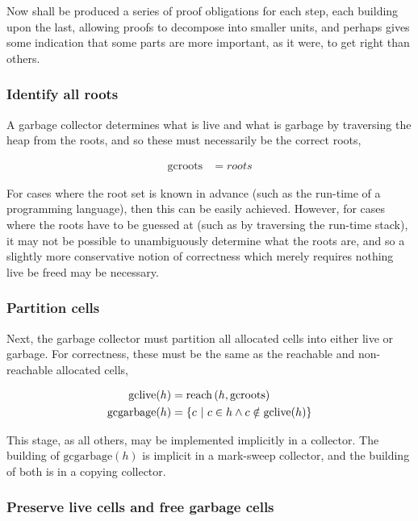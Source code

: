 Now shall be produced a series of proof obligations for each step,
each building upon the last, allowing proofs to decompose into smaller
units, and perhaps gives some indication that some parts are more
important, as it were, to get right than others.

\subsubsection{Identify all roots}
\label{sec:gc-framework-obligations-roots}

A garbage collector determines what is live and what is garbage by
traversing the heap from the roots, and so these must necessarily be
the correct roots,

\begin{align*}
  \mathrm{gcroots} &= roots
\end{align*}

For cases where the root set is known in advance (such as the run-time
of a programming language), then this can be easily achieved. However,
for cases where the roots have to be guessed at (such as by traversing
the run-time stack), it may not be possible to unambiguously determine
what the roots are, and so a slightly more conservative notion of
correctness which merely requires nothing live be freed may be
necessary.

\subsubsection{Partition cells}
\label{sec:gc-framework-obligations-partition}

Next, the garbage collector must partition all allocated cells into
either live or garbage. For correctness, these must be the same as the
reachable and non-reachable allocated cells,

\begin{align*}
  \mathrm{gclive}(h) &= \mathrm{reach}\left(h, \mathrm{gcroots}\right)\\
  \mathrm{gcgarbage}(h) &= \left\{c~|~c \in h \land c \notin
    \mathrm{gclive}(h)\right\}
\end{align*}

This stage, as all others, may be implemented implicitly in a
collector. The building of $\mathrm{gcgarbage}(h)$ is implicit in a
mark-sweep collector, and the building of both is in a copying
collector.

\subsubsection{Preserve live cells and free garbage cells}
\label{sec:gc-framework-obligations-collect}

